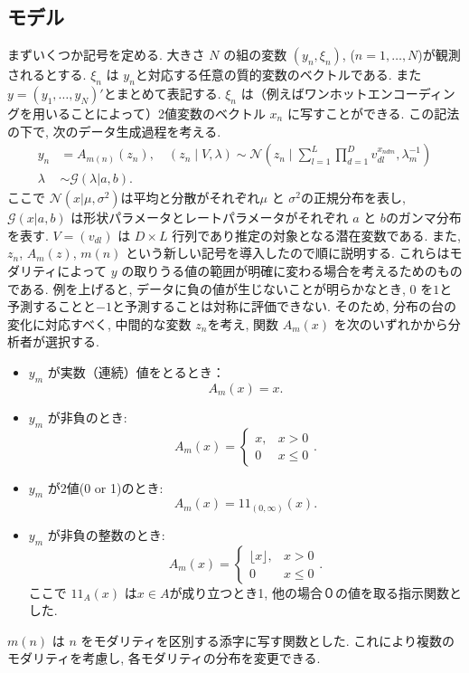 \documentclass[a4paper,12ptc]{jsarticle} %
\newcommand{\normal}{\mathcal{N}}
\newcommand{\gam}{\mathcal{G}}
\newcommand{\one}{1\!\!1}
\begin{document}
\subsection{モデル}
まずいくつか記号を定める. 大きさ $N$ の組の変数 $(y_n, \xi_n)$, ($n=1,\ldots, N$)が観測されるとする. $\xi_n$ は $y_n$と対応する任意の質的変数のベクトルである. また $y=(y_1, \ldots, y_N)'$とまとめて表記する. 
$\xi_n$ は（例えばワンホットエンコーディングを用いることによって）2値変数のベクトル $x_n$ に写すことができる. この記法の下で, 次のデータ生成過程を考える.
\begin{align}
y_{n} &= A_{m(n)}(z_{n}), \quad (z_{n} \mid V, \lambda) \sim \mathcal{N}\left(z_n \mid \sum_{l=1}^L \prod_{d=1}^Dv_{dl}^{x_{ndm}}, \lambda^{-1}_m\right)  \label{eq_mod1}\\
\lambda & \sim \gam(\lambda | a,b). \nonumber
\end{align}
ここで $\normal(x|\mu,\sigma^2)$は平均と分散がそれぞれ$\mu$ と $\sigma^2$の正規分布を表し, $\gam(x|a,b)$ は形状パラメータとレートパラメータがそれぞれ $a$ と $b$のガンマ分布を表す. $V=(v_{dl})$ は $D \times L$  行列であり推定の対象となる潜在変数である. また, $z_n$, $A_{m}(z)$, $m(n)$ という新しい記号を導入したので順に説明する. これらはモダリティによって $y$ の取りうる値の範囲が明確に変わる場合を考えるためのものである.
例を上げると, データに負の値が生じないことが明らかなとき, $0$ を$1$と予測することと$-1$と予測することは対称に評価できない.
そのため, 分布の台の変化に対応すべく, 中間的な変数 $z_n$を考え, 関数 $A_m(x)$ を次のいずれかから分析者が選択する.
\begin{itemize}
\item $y_m$ が実数（連続）値をとるとき： 
$$
A_m(x)=x.
$$
\item $y_m$ が非負のとき:
$$
A_m(x)=\begin{cases}x, &x>0\\0 &x\leq 0\end{cases}.
$$
\item
$y_m$ が2値(0 or 1)のとき:
$$
A_m(x)=\one_{(0,\infty)}(x).
$$
\item
$y_m$ が非負の整数のとき:
$$
A_m(x)=\begin{cases}\lfloor x\rfloor, & x>0 \\ 
0 &x \leq 0
\end{cases}.
$$
ここで $\one_{A}(x)$ は$x \in A$が成り立つとき1, 他の場合０の値を取る指示関数とした.
\end{itemize}
$m(n)$ は $n$ をモダリティを区別する添字に写す関数とした. これにより複数のモダリティを考慮し, 各モダリティの分布を変更できる.
\end{document}
